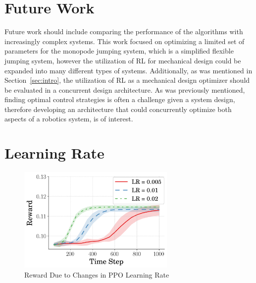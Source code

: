 \documentclass[10pt,twocolumn,letterpaper]{article}
\begin{document}
\section{Future Work}
Future work should include comparing the performance of the algorithms with increasingly complex systems. This work focused on optimizing a limited set of parameters for the monopode jumping system, which is a simplified flexible jumping system, however the utilization of RL for mechanical design could be expanded into many different types of systems. Additionally, as was mentioned in Section~\ref*{sec:intro}, the utilization of RL as a mechanical design optimizer should be evaluated in a concurrent design architecture. As was previously mentioned, finding optimal control strategies is often a challenge given a system design, therefore developing an architecture that could concurrently optimize both aspects of a robotics system, is of interest. 


{\small


}

\appendix

\section{Learning Rate}
\label{app:lr_changes}
\begin{figure}[b]
\begin{center}
        \includegraphics[width=3in]{figures/comp_learning_rate/avg_rew_ppo.png}
        \caption{Reward Due to Changes in PPO Learning Rate}
        \label{fig:ppo_rew}
\end{center}
\end{figure}


\end{document}
